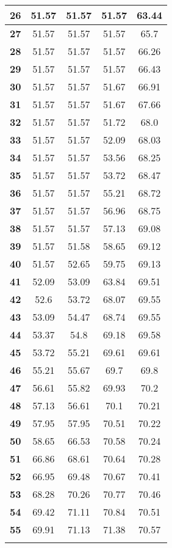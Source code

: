 \begin{longtable}{|c|c|c|c|c|}
\textbf{26} & 51.57 & 51.57 & 51.57 & 63.44 \\ \hline 
\textbf{27} & 51.57 & 51.57 & 51.57 & 65.7 \\ \hline 
\textbf{28} & 51.57 & 51.57 & 51.57 & 66.26 \\ \hline 
\textbf{29} & 51.57 & 51.57 & 51.57 & 66.43 \\ \hline 
\textbf{30} & 51.57 & 51.57 & 51.67 & 66.91 \\ \hline 
\textbf{31} & 51.57 & 51.57 & 51.67 & 67.66 \\ \hline 
\textbf{32} & 51.57 & 51.57 & 51.72 & 68.0 \\ \hline 
\textbf{33} & 51.57 & 51.57 & 52.09 & 68.03 \\ \hline 
\textbf{34} & 51.57 & 51.57 & 53.56 & 68.25 \\ \hline 
\textbf{35} & 51.57 & 51.57 & 53.72 & 68.47 \\ \hline 
\textbf{36} & 51.57 & 51.57 & 55.21 & 68.72 \\ \hline 
\textbf{37} & 51.57 & 51.57 & 56.96 & 68.75 \\ \hline 
\textbf{38} & 51.57 & 51.57 & 57.13 & 69.08 \\ \hline 
\textbf{39} & 51.57 & 51.58 & 58.65 & 69.12 \\ \hline 
\textbf{40} & 51.57 & 52.65 & 59.75 & 69.13 \\ \hline 
\textbf{41} & 52.09 & 53.09 & 63.84 & 69.51 \\ \hline 
\textbf{42} & 52.6 & 53.72 & 68.07 & 69.55 \\ \hline 
\textbf{43} & 53.09 & 54.47 & 68.74 & 69.55 \\ \hline 
\textbf{44} & 53.37 & 54.8 & 69.18 & 69.58 \\ \hline 
\textbf{45} & 53.72 & 55.21 & 69.61 & 69.61 \\ \hline 
\textbf{46} & 55.21 & 55.67 & 69.7 & 69.8 \\ \hline 
\textbf{47} & 56.61 & 55.82 & 69.93 & 70.2 \\ \hline 
\textbf{48} & 57.13 & 56.61 & 70.1 & 70.21 \\ \hline 
\textbf{49} & 57.95 & 57.95 & 70.51 & 70.22 \\ \hline 
\textbf{50} & 58.65 & 66.53 & 70.58 & 70.24 \\ \hline 
\textbf{51} & 66.86 & 68.61 & 70.64 & 70.28 \\ \hline 
\textbf{52} & 66.95 & 69.48 & 70.67 & 70.41 \\ \hline 
\textbf{53} & 68.28 & 70.26 & 70.77 & 70.46 \\ \hline 
\textbf{54} & 69.42 & 71.11 & 70.84 & 70.51 \\ \hline 
\textbf{55} & 69.91 & 71.13 & 71.38 & 70.57 \\ \hline 

    \caption[]{}
    \label{Tab:}
\end{longtable}